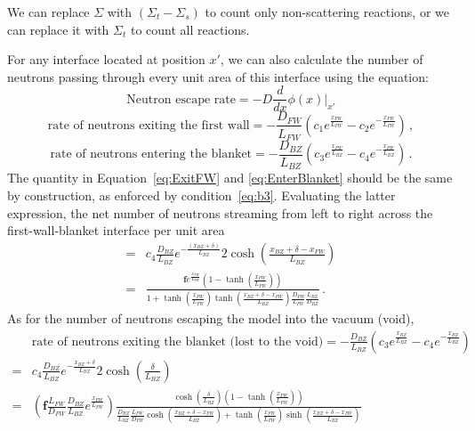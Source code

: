 \documentclass[a4paper, 12pt]{article}
\newcommand{\ve}[1]{\boldsymbol{#1}}
\newcommand{\flux}[0]{\ve{f}}
\newcommand{\xFW}[0]{x_{FW}}
\newcommand{\DFW}[0]{D_{FW}}
\newcommand{\LFW}[0]{L_{FW}}
\newcommand{\xBZ}[0]{x_{BZ}}
\newcommand{\DBZ}[0]{D_{BZ}}
\newcommand{\LBZ}[0]{L_{BZ}}
\newcommand{\eBZ}[0]{x_{BZ}+\delta}
\begin{document}
We can replace $\Sigma$ with $(\Sigma_t-\Sigma_s)$ to count only non-scattering reactions, or we can replace it with $\Sigma_t$ to count all reactions.

For any interface located at position $x'$, we can also calculate the number of neutrons passing through every unit area of this interface using the equation:
\begin{equation}
    \text{Neutron escape rate} = -D \frac{d}{dx}\phi(x)\Bigg|_{x'}\label{eq:EscapedFlux}
\end{equation}
\begin{equation}\label{eq:ExitFW}
    \text{rate of neutrons exiting the first wall} = -\frac{\DFW }{\LFW }\left(c_1 e^{\frac{\xFW }{\LFW }} - c_2e^{-\frac{\xFW }{\LFW }}\right)\,,
\end{equation}
\begin{equation}\label{eq:EnterBlanket}
    \text{rate of neutrons entering the blanket} = -\frac{\DBZ }{\LBZ}\left(c_3 e^{\frac{\xFW }{\LBZ }} - c_4 e^{-\frac{\xFW }{\LBZ }}\right)\,.
\end{equation}
The quantity in Equation~\ref{eq:ExitFW} and \ref{eq:EnterBlanket} should be the same by construction, as enforced by condition~\ref{eq:b3}. Evaluating the latter expression, the net number of neutrons streaming from left to right across the first-wall-blanket interface per unit area
\begin{align}
    =& c_4 \frac{\DBZ }{\LBZ }e^{-\frac{(\eBZ )}{\LBZ }} 2\cosh\left(\frac{\eBZ -\xFW}{\LBZ } \right)\nonumber\\
    =& \frac{\flux e^{\frac{\xFW }{\LFW } } \left(1-\tanh\left(\frac{\xFW }{\LFW }\right)\right)}{1 + \tanh\left(\frac{\xFW }{\LFW }\right) \tanh\left(\frac{\eBZ - \xFW }{\LBZ }\right) \frac{\DFW }{\LFW }\frac{\LBZ }{\DBZ }}\,.
\end{align}
As for the number of neutrons escaping the model into the vacuum (void), 
\begin{align}
    &\text{rate of neutrons exiting the blanket (lost to the void)} = -\frac{\DBZ }{\LBZ}\left(c_3 e^{\frac{\xBZ }{\LBZ }} - c_4 e^{-\frac{\xBZ }{\LBZ }}\right)\nonumber\\
    =& c_4 \frac{\DBZ }{\LBZ } e^{-\frac{\eBZ }{\LBZ }} 2\cosh\left(\frac{\delta}{\LBZ }\right)\nonumber\\
    =& \left(\flux\frac{\LFW }{\DFW }\frac{\DBZ }{\LBZ } e^{\frac{\xFW }{\LFW } }\right) \frac{\cosh\left(\frac{\delta}{\LBZ }\right)\left(1-\tanh\left(\frac{\xFW }{\LFW }\right)\right)}{\frac{\DBZ }{\LBZ } \frac{\LFW }{\DFW } \cosh\left(\frac{\eBZ-\xFW}{\LBZ }\right) + \tanh\left(\frac{\xFW }{\LFW }\right) \sinh\left(\frac{\eBZ - \xFW }{\LBZ }\right)}
\end{align}
\end{document}
